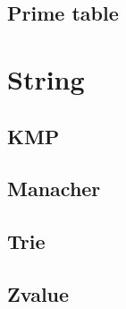 \subsection{Prime table}


\section{String}

\subsection{KMP}

\subsection{Manacher}

\subsection{Trie}

\subsection{Zvalue}
